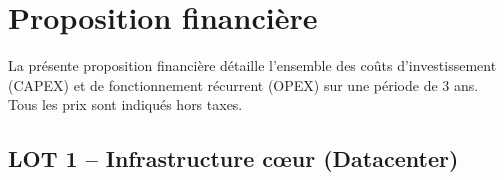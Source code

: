 \documentclass[12pt,a4paper]{report}
\begin{document}
\chapter{Proposition financière}

La présente proposition financière détaille l'ensemble des coûts d'investissement (CAPEX) et de fonctionnement récurrent (OPEX) sur une période de 3 ans. Tous les prix sont indiqués hors taxes.

\section{LOT 1 -- Infrastructure c\oe ur (Datacenter)}
\end{document}
